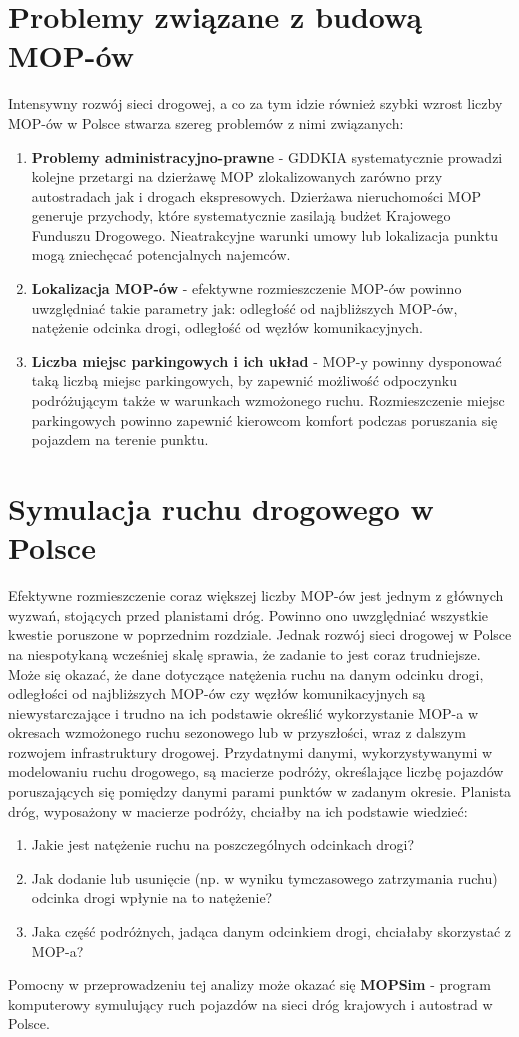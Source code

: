 \section{Problemy związane z budową MOP-ów}
Intensywny rozwój sieci drogowej, a co za tym idzie również szybki wzrost liczby MOP-ów w Polsce stwarza szereg problemów z nimi związanych:
\begin{enumerate}
    \item \textbf{Problemy administracyjno-prawne} - GDDKIA systematycznie prowadzi kolejne przetargi na dzierżawę MOP zlokalizowanych zarówno przy autostradach jak i drogach ekspresowych. Dzierżawa nieruchomości MOP generuje przychody, które systematycznie zasilają budżet Krajowego Funduszu Drogowego. Nieatrakcyjne warunki umowy lub lokalizacja punktu mogą zniechęcać potencjalnych najemców.
    \item \textbf{Lokalizacja MOP-ów} - efektywne rozmieszczenie MOP-ów powinno uwzględniać takie parametry jak: odległość od najbliższych MOP-ów, natężenie odcinka drogi, odległość od węzłów komunikacyjnych.
    \item \textbf{Liczba miejsc parkingowych i ich układ} - MOP-y powinny dysponować taką liczbą miejsc parkingowych, by zapewnić możliwość odpoczynku podróżującym także w warunkach wzmożonego ruchu. Rozmieszczenie miejsc parkingowych powinno zapewnić kierowcom komfort podczas poruszania się pojazdem na terenie punktu.
\end{enumerate}

\section{Symulacja ruchu drogowego w Polsce}
Efektywne rozmieszczenie coraz większej liczby MOP-ów jest jednym z głównych wyzwań, stojących przed planistami dróg. Powinno ono uwzględniać wszystkie kwestie poruszone w poprzednim rozdziale. Jednak rozwój sieci drogowej w Polsce na niespotykaną wcześniej skalę sprawia, że zadanie to jest coraz trudniejsze. Może się okazać, że dane dotyczące natężenia ruchu na danym odcinku drogi, odległości od najbliższych MOP-ów czy węzłów komunikacyjnych są niewystarczające i trudno na ich podstawie określić wykorzystanie MOP-a w okresach wzmożonego ruchu sezonowego lub w przyszłości, wraz z dalszym rozwojem infrastruktury drogowej. Przydatnymi danymi, wykorzystywanymi w modelowaniu ruchu drogowego, są macierze podróży, określające liczbę pojazdów poruszających się pomiędzy danymi parami punktów w zadanym okresie. Planista dróg, wyposażony w macierze podróży, chciałby na ich podstawie wiedzieć:
\begin{enumerate}
	\item Jakie jest natężenie ruchu na poszczególnych odcinkach drogi?
	\item Jak dodanie lub usunięcie (np. w wyniku tymczasowego zatrzymania ruchu) odcinka drogi wpłynie na to natężenie?
	\item Jaka część podróżnych, jadąca danym odcinkiem drogi, chciałaby skorzystać z MOP-a?
\end{enumerate}
Pomocny w przeprowadzeniu tej analizy może okazać się \textbf{MOPSim} - program komputerowy symulujący ruch pojazdów na
sieci dróg krajowych i autostrad w Polsce.

